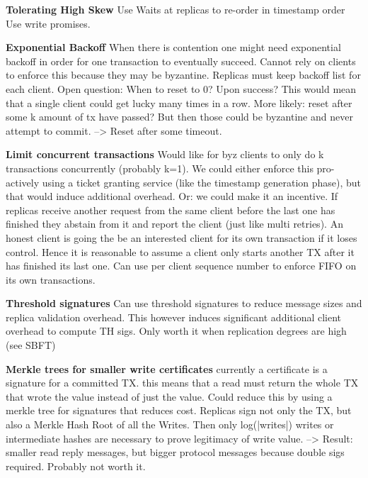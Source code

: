 \textbf{Tolerating High Skew}
Use Waits at replicas to re-order in timestamp order
Use write promises.


\textbf{Exponential Backoff}
When there is contention one might need exponential backoff in order for one transaction to eventually succeed. Cannot rely on clients to enforce this because they may be byzantine. Replicas must keep backoff list for each client.
Open question: When to reset to 0? Upon success? This would mean that a single client could get lucky many times in a row. More likely: reset after some k amount of tx have passed? But then those could be byzantine and never attempt to commit. --> Reset after some timeout.


\textbf{Limit concurrent transactions}
Would like for byz clients to only do k transactions concurrently (probably k=1). We could either enforce this pro-actively using a ticket granting service (like the timestamp generation phase), but that would induce additional overhead. Or: we could make it an incentive. If replicas receive another request from the same client before the last one has finished they abstain from it and report the client (just like multi retries). An honest client is going the be an interested client for its own transaction if it loses control. Hence it is reasonable to assume a client only starts another TX after it has finished its last one. Can use per client sequence number to enforce FIFO on its own transactions.

\textbf{Threshold signatures}
Can use threshold signatures to reduce message sizes and replica validation overhead. This however induces significant additional client overhead to compute TH sigs. Only worth it when replication degrees are high (see SBFT)

\textbf{Merkle trees for smaller write certificates}
currently a certificate is a signature for a committed TX. this means that a read must return the whole TX that wrote the value instead of just the value. Could reduce this by using a merkle tree for signatures that reduces cost.
Replicas sign not only the TX, but also a Merkle Hash Root of all the Writes. Then only log(|writes|) writes or intermediate hashes are necessary to prove legitimacy of write value.
--> Result: smaller read reply messages, but bigger protocol messages because double sigs required. Probably not worth it.

